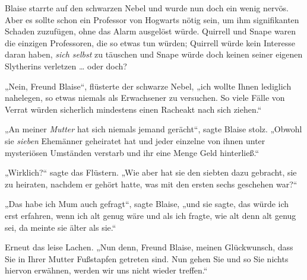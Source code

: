 Blaise starrte auf den schwarzen Nebel und wurde nun doch ein wenig nervös. Aber es sollte schon ein Professor von Hogwarts nötig sein, um ihm signifikanten Schaden zuzufügen, ohne das Alarm ausgelöst würde. Quirrell und Snape waren die einzigen Professoren, die so etwas tun würden; Quirrell würde kein Interesse daran haben, \emph{sich selbst} zu täuschen und Snape würde doch keinen seiner eigenen Slytherins verletzen … oder doch?

„Nein, Freund Blaise“, flüsterte der schwarze Nebel, „ich wollte Ihnen lediglich nahelegen, so etwas niemals als Erwachsener zu versuchen. So viele Fälle von Verrat würden sicherlich mindestens einen Racheakt nach sich ziehen.“

„An meiner \emph{Mutter} hat sich niemals jemand gerächt“, sagte Blaise stolz.
„Obwohl sie \emph{sieben} Ehemänner geheiratet hat und jeder einzelne von ihnen unter mysteriösen Umständen verstarb und ihr eine Menge Geld hinterließ.“

„Wirklich?“ sagte das Flüstern.
„Wie aber hat sie den siebten dazu gebracht, sie zu heiraten, nachdem er gehört hatte, was mit den ersten sechs geschehen war?“

„Das habe ich Mum auch gefragt“, sagte Blaise, „und sie sagte, das würde ich erst erfahren, wenn ich alt genug wäre und als ich fragte, wie alt denn alt genug sei, da meinte sie älter als sie.“

Erneut das leise Lachen.
„Nun denn, Freund Blaise, meinen Glückwunsch, dass Sie in Ihrer Mutter Fußstapfen getreten sind. Nun gehen Sie und so Sie nichts hiervon erwähnen, werden wir uns nicht wieder treffen.“

